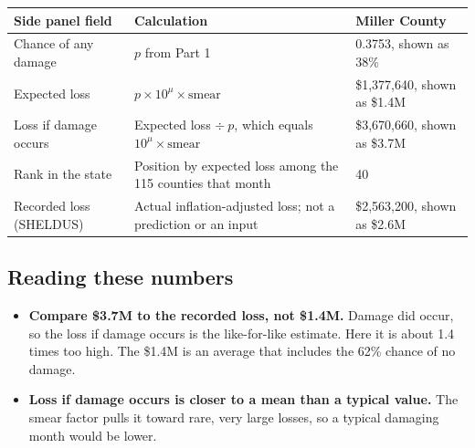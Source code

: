 \documentclass[11pt]{article}
\begin{document}
\begin{table}[H]
\centering
\small
\begin{tabularx}{\textwidth}{>{\raggedright\arraybackslash}p{3.6cm}Yl}
\toprule
\textbf{Side panel field} & \textbf{Calculation} & \textbf{Miller County} \\
\midrule
Chance of any damage & $p$ from Part 1 & 0.3753, shown as 38\% \\
Expected loss & $p \times 10^{\mu} \times \text{smear}$ & \$1,377,640, shown as \$1.4M \\
Loss if damage occurs & Expected loss $\div\ p$, which equals $10^{\mu} \times \text{smear}$ & \$3,670,660, shown as \$3.7M \\
Rank in the state & Position by expected loss among the 115 counties that month & 40 \\
Recorded loss (SHELDUS) & Actual inflation-adjusted loss; not a prediction or an input & \$2,563,200, shown as \$2.6M \\
\bottomrule
\end{tabularx}
\end{table}

\subsection*{Reading these numbers}

\begin{itemize}
  \item \textbf{Compare \$3.7M to the recorded loss, not \$1.4M.} Damage did occur, so the loss if
        damage occurs is the like-for-like estimate. Here it is about 1.4 times too high. The
        \$1.4M is an average that includes the 62\% chance of no damage.
  \item \textbf{Loss if damage occurs is closer to a mean than a typical value.} The smear factor
        pulls it toward rare, very large losses, so a typical damaging month would be lower.
\end{itemize}
\end{document}
